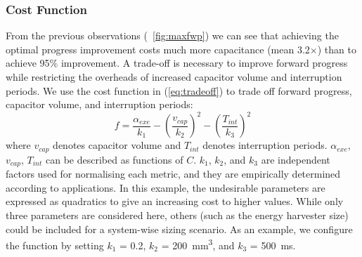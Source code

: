 
\subsubsection{Cost Function}

From the previous observations (\figurename{~\ref{fig:maxfwp}}) we can see that achieving the optimal progress improvement costs much more capacitance (mean 3.2$\times$) than to achieve 95\% improvement. A trade-off is necessary to improve forward progress while restricting the overheads of increased capacitor volume and interruption periods. We use the cost function in (\ref{eq:tradeoff}) to trade off forward progress, capacitor volume, and interruption periods: 
\begin{equation}
    f = \frac{\alpha_{exe}}{k_1} - \left(\frac{v_{cap}}{k_2}\right) ^ {2} - \left(\frac{T_{int}}{k_3}\right) ^ {2} 
    \label{eq:tradeoff}
\end{equation}
where $v_{cap}$ denotes capacitor volume and $T_{int}$ denotes interruption periods. $\alpha_{exe}$, $v_{cap}$, $T_{int}$ can be described as functions of $C$. $k_1$, $k_2$, and $k_3$ are independent factors used for normalising each metric, and they are empirically determined according to applications. In this example, the undesirable parameters are expressed as quadratics to give an increasing cost to higher values. While only three parameters are considered here, others (such as the energy harvester size) could be included for a system-wise sizing scenario.
As an example, we configure the function by setting $k_1$ = 0.2, $k_2$ = \SI{200}{\cubic\milli\meter}, and $k_3$ = \SI{500}{\milli\second}. 

